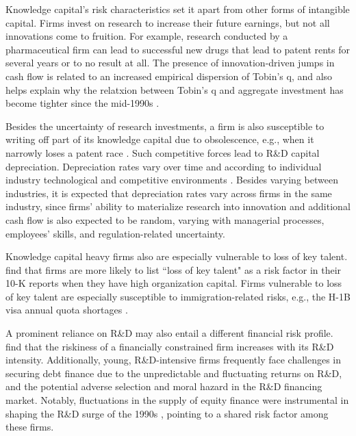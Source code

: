 \documentclass[12pt, letterpaper]{article}
\begin{document}
Knowledge capital's risk characteristics set it apart from other forms of intangible capital. Firms invest on research to increase their future earnings, but not all innovations come to fruition. For example, research conducted by a pharmaceutical firm can lead to successful new drugs that lead to patent rents for several years or to no result at all. The presence of innovation-driven jumps in cash flow is related to an increased empirical dispersion of Tobin's q, and also helps explain why the relatxion between Tobin's q and aggregate investment has become tighter since the mid-1990s \citep{Andrei2019-bh}. 

Besides the uncertainty of research investments, a firm is also susceptible to writing off part of its knowledge capital due to obsolescence, e.g., when it narrowly loses a patent race \citep{Peters2017-fl}. Such competitive forces lead to R\&D capital depreciation. Depreciation rates vary over time and according to individual industry technological and competitive environments \citep{Li2020-xc}. Besides varying between industries, it is expected that depreciation rates vary across firms in the same industry, since firms' ability to materialize research into innovation and additional cash flow is also expected to be random, varying with managerial processes, employees' skills, and regulation-related uncertainty.

Knowledge capital heavy firms also are especially vulnerable to loss of key talent. \cite{Eisfeldt2013-ad} find that firms are more likely to list ``loss of key talent" as a risk factor in their 10-K reports when they have high organization capital. Firms vulnerable to loss of key talent are especially susceptible to immigration-related risks, e.g., the H-1B visa annual quota shortages \citep{Peri2015-qt}. 

A prominent reliance on R\&D may also entail a different financial risk profile. \cite{Li2011-ay} find that the riskiness of a financially constrained firm increases with its R\&D intensity. Additionally, young, R\&D-intensive firms frequently face challenges in securing debt finance due to the unpredictable and fluctuating returns on R\&D, and the potential adverse selection and moral hazard in the R\&D financing market. Notably, fluctuations in the supply of equity finance were instrumental in shaping the R\&D surge of the 1990s \citep{Brown2009-zp}, pointing to a shared risk factor among these firms.
\end{document}
